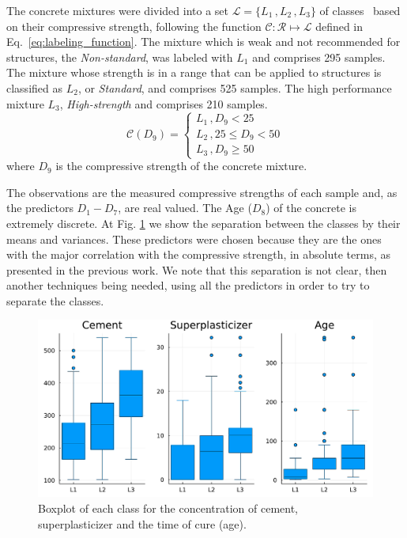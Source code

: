 \documentclass[conference]{IEEEtran}
\begin{document}
The concrete mixtures were divided into a set $\mathcal{L} = \{L_1\,, L_2\,, L_3\}$ of classes~\cite{b1} based on their compressive strength, following the function $\mathcal{C} \colon \mathcal{R} \mapsto \mathcal{L}$ defined in Eq.~\ref{eq:labeling_function}. The mixture which is weak and not recommended for structures, the \emph{Non-standard}, was labeled with $L_1$ and comprises 295 samples. The mixture whose strength is in a range that can be applied to structures is classified as $L_2$, or \emph{Standard}, and comprises 525 samples. The high performance mixture $L_3$, \emph{High-strength} and comprises 210 samples.
%
\begin{equation}\label{eq:labeling_function}
  \mathcal{C}(D_9) = \begin{cases}
    L_1\,, D_9 < 25\\
    L_2\,, 25 \leq D_9 < 50\\
    L_3\,, D_9 \geq 50
  \end{cases}
\end{equation}
%
where $D_9$ is the compressive strength of the concrete mixture.

The observations are the measured compressive strengths of each sample and, as the predictors $D_1 - D_7$, are real valued. The Age ($D_8$) of the concrete is extremely discrete. At Fig. \ref{boxplot_corr_predictors} we show the separation between the classes by their means and variances. These predictors were chosen because they are the ones with the major correlation with the compressive strength, in absolute terms, as presented in the previous work. We note that this separation is not clear, then another techniques being needed, using all the predictors in order to try to separate the classes.

\begin{figure}[htbp]
\centerline{\includegraphics[width=\columnwidth]{../figures/most_corr_predictors}}
\caption{Boxplot of each class for the concentration of cement, superplasticizer and the time of cure (age).}
\label{boxplot_corr_predictors}
\end{figure}
\end{document}

